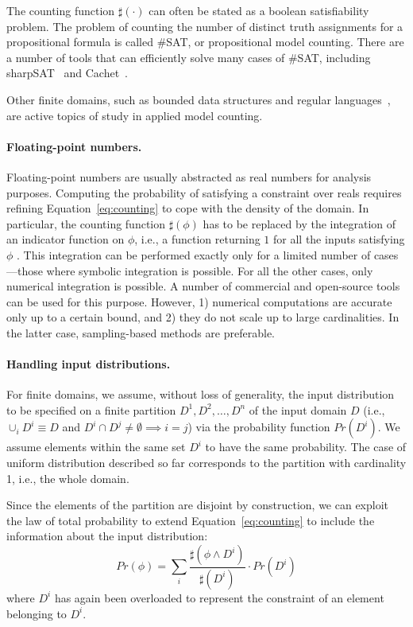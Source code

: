 The counting function $\sharp(\cdot)$ can often be stated as a boolean
satisfiability problem.
The problem of counting the number of distinct truth assignments for
a propositional formula is called \#SAT, or propositional model counting.
There are a number of tools that can efficiently solve many cases of
\#SAT, including sharpSAT~\cite{thurley2006sharpsat} and Cachet~\cite{sang2005heuristics}.

Other finite domains, such as bounded data structures \cite{Filieri2015} and regular languages~\cite{Luu2014,Aydin2015}, are active topics of study in applied model counting.


\paragraph{Floating-point numbers.} 
Floating-point numbers are usually abstracted as real numbers for analysis purposes. Computing the probability of satisfying a constraint over reals requires refining Equation~\ref{eq:counting} to cope with the density of the domain. In particular, the counting function $\sharp(\phi)$ has to be replaced by the integration of an indicator function on $\phi$, i.e., a function returning $1$ for all the inputs satisfying $\phi$ \cite{Borges2014}. This integration can be performed exactly only for a limited number of cases---those where symbolic integration is possible. For all the other cases, only numerical integration is possible. A number of commercial and open-source tools can be used for this purpose. However, 1) numerical computations are accurate only up to a certain bound, and 2) they do not scale up to large cardinalities. In the latter case, sampling-based methods are preferable. 

\paragraph{Handling input distributions.} 
For finite domains, we assume, without loss of generality, the input distribution to be specified on a finite partition $D^1, D^2, \dots, D^n$ of the input domain $D$ (i.e., $\cup_i D^i \equiv D$ and $D^i \cap D^j \neq \emptyset \implies i=j$) via the probability function $Pr(D^i)$. We assume elements within the same set $D^i$ to have the same probability. The case of uniform distribution described so far corresponds to the partition with cardinality 1, i.e., the whole domain.
 
Since the elements of the partition are disjoint by construction, we can exploit the law of total probability to extend Equation~\eqref{eq:counting} to include the information about the input distribution:
%
\begin{equation}\label{eq:countingInputDistribution}
	Pr(\phi) = \sum_i \frac{\sharp(\phi \land D^i)}{\sharp(D^i)} \cdot Pr(D^i)
\end{equation}
%
\noindent where $D^i$ has again been overloaded to represent the constraint of an element belonging to $D^i$.

